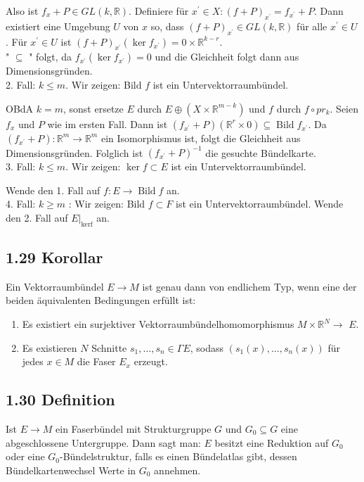 \documentclass[10pt, letterpaper]{article}
\begin{document}
Also ist $f_{x}+P \in G L(k, \mathbb{R})$. Definiere für $x^{\prime} \in X:(f+P)_{x^{\prime}}=f_{x^{\prime}}+P$. Dann existiert eine Umgebung $U$ von $x$ so, dass $(f+P)_{x^{\prime}} \in G L(k, \mathbb{R})$ für alle $x^{\prime} \in U$. Für $x^{\prime} \in U$ ist $(f+P)_{x^{\prime}}\left(\operatorname{ker} f_{x^{\prime}}\right)=0 \times \mathbb{R}^{k-r}$.\\
" $\subseteq$ " folgt, da $f_{x^{\prime}}\left(\operatorname{ker} f_{x^{\prime}}\right)=0$ und die Gleichheit folgt dann aus Dimensionsgründen.\\
2. Fall: $k \leq m$. Wir zeigen: Bild $f$ ist ein Untervektorraumbündel.

OBdA $k=m$, sonst ersetze $E$ durch $E \oplus\left(X \times \mathbb{R}^{m-k}\right)$ und $f$ durch $f \circ p r_{k}$. Seien $f_{x}$ und $P$ wie im ersten Fall. Dann ist $\left(f_{x^{\prime}}+P\right)\left(\mathbb{R}^{r} \times 0\right) \subseteq \operatorname{Bild} f_{x^{\prime}}$. Da $\left(f_{x^{\prime}}+P\right): \mathbb{R}^{m} \rightarrow \mathbb{R}^{m}$ ein Isomorphismus ist, folgt die Gleichheit aus Dimensionsgründen. Folglich ist $\left(f_{x^{\prime}}+P\right)^{-1}$ die gesuchte Bündelkarte.\\
3. Fall: $k \leq m$. Wir zeigen: $\operatorname{ker} f \subset E$ ist ein Untervektorraumbündel.

Wende den 1. Fall auf $f: E \rightarrow \operatorname{Bild} f$ an.\\
4. Fall: $k \geq m$ : Wir zeigen: Bild $f \subset F$ ist ein Untervektorraumbündel. Wende den 2. Fall auf $\left.E\right|_{\operatorname{kerf}}$ an.

\subsection*{1.29 Korollar}
Ein Vektorraumbündel $E \rightarrow M$ ist genau dann von endlichem Typ, wenn eine der beiden äquivalenten Bedingungen erfüllt ist:

\begin{enumerate}
  \item Es existiert ein surjektiver Vektorraumbündelhomomorphismus $M \times \mathbb{R}^{N} \rightarrow$ $E$.
  \item Es existieren $N$ Schnitte $s_{1}, \ldots, s_{n} \in \Gamma E$, sodass $\left(s_{1}(x), \ldots, s_{n}(x)\right)$ für jedes $x \in M$ die Faser $E_{x}$ erzeugt.
\end{enumerate}

\subsection*{1.30 Definition}
Ist $E \rightarrow M$ ein Faserbündel mit Strukturgruppe $G$ und $G_{0} \subseteq G$ eine abgeschlossene Untergruppe. Dann sagt man: $E$ besitzt eine Reduktion auf $G_{0}$ oder eine $G_{0}$-Bündelstruktur, falls es einen Bündelatlas gibt, dessen Bündelkartenwechsel Werte in $G_{0}$ annehmen.
\end{document}
